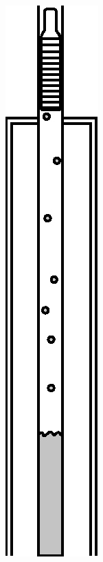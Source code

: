 \begin{figure}[htbp]
    {\centering \includegraphics[height=.3\textheight]{fig/foamer/plunger-conventional/conventionalplunger-D.eps} \label{fig:plunger-conventional-D}} \qquad \qquad
    \subfloat[][]

\end{figure}
